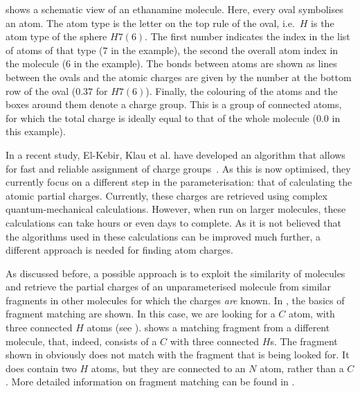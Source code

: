  shows a schematic view of an ethanamine molecule. Here, every oval symbolises an atom. The atom type is the letter on the top rule of the oval, i.e.\ $H$ is the atom type of the sphere $H7 (6)$. The first number indicates the index in the list of atoms of that type ($7$ in the example), the second the overall atom index in the molecule ($6$ in the example). The bonds between atoms are shown as lines between the ovals and the atomic charges are given by the number at the bottom row of the oval ($0.37$ for $H7 (6)$). Finally, the colouring of the atoms and the boxes around them denote a charge group. This is a group of connected atoms, for which the total charge is ideally equal to that of the whole molecule ($0.0$ in this example).

In a recent study, El-Kebir, Klau et al. have developed an algorithm that allows for fast and reliable assignment of charge groups~\cite{canzar2012charge}. As this is now optimised, they currently focus on a different step in the parameterisation: that of calculating the atomic partial charges. Currently, these charges are retrieved using complex quantum-mechanical calculations. However, when run on larger molecules, these calculations can take hours or even days to complete. As it is not believed that the algorithms used in these calculations can be improved much further, a different approach is needed for finding atom charges.

As discussed before, a possible approach is to exploit the similarity of molecules and retrieve the partial charges of an unparameterised molecule from similar fragments in other molecules for which the charges \emph{are} known. In , the basics of fragment matching are shown. In this case, we are looking for a $C$ atom, with three connected $H$ atoms (see ).  shows a matching fragment from a different molecule, that, indeed, consists of a $C$ with three connected $H$s. The fragment shown in  obviously does not match with the fragment that is being looked for. It does contain two $H$ atoms, but they are connected to an $N$ atom, rather than a $C$. More detailed information on fragment matching can be found in .

